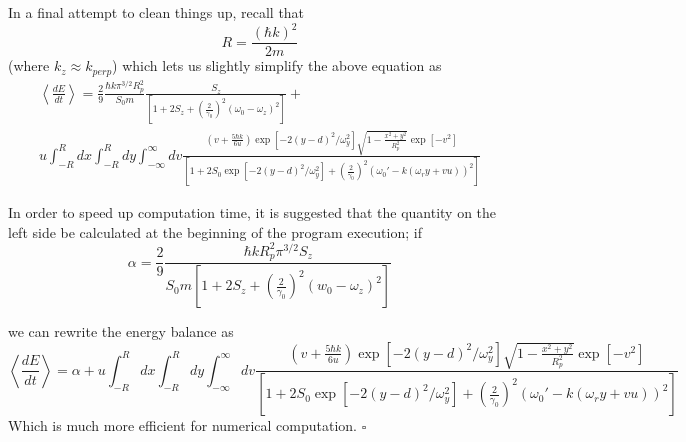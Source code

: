 \documentclass[11pt, oneside,reqno]{amsart}   	%
\newcommand{\eqn}[1]{\begin{equation}#1 \end{equation}}
\begin{document}
 
 In a final attempt to clean things up, recall that \eqn{ R = \frac{(\hbar k)^2}{2m}} (where $k_z \approx k_{perp}$) which lets us slightly simplify the above equation as 
\begin{multline}
 \left< \frac{dE}{dt} \right> =
\frac{2}{9}
\frac{\hbar k \pi^{3/2}R_p^2 }{S_0 m } \frac{S_z }{\left[ 1 + 2S_z+ \left(\frac{2}{\gamma_0}\right)^2(\omega_0 -\omega_z)^2 \right]}+ \\
  u \int_{-R}^{R} dx \int_{-R}^R  dy \int_{-\infty}^{\infty} dv 
 \frac{
 ( v+\frac{5 \hbar k}{6u})
 \exp [ -2 (y-d)^2/\omega_y^2] \sqrt{1-\frac{x^2+y^2}{R_p^2}} \exp [-v^2]
 }
 { \left[ 1+2S_0 \exp [ -2 (y-d)^2/\omega_y^2] +\left( \frac{2}{\gamma_0} \right)^2  (\omega_0' - k(\omega_r y +v u))^2 \right]}
\end{multline}

In order to speed up computation time, it is suggested that the quantity on the left side be calculated at the beginning of the program execution;
if 
\eqn{ \alpha = \frac{2}{9} \frac{ \hbar k  R_p^2 \pi^{3/2} S_z}{ S_0  m \left[ 1+ 2 S_z + \left( \frac{2}{\gamma_0} \right)^2 (w_0 -\omega_z )^2 \right]}}

we can rewrite the energy balance as 
\eqn{  \left< \frac{dE}{dt} \right> = \alpha +  u \int_{-R}^{R} dx \int_{-R}^R  dy \int_{-\infty}^{\infty} dv 
 \frac{
  ( v+\frac{5 \hbar k}{6 u })
 \exp [ -2 (y-d)^2/\omega_y^2] \sqrt{1-\frac{x^2+y^2}{R_p^2}} \exp [-v^2]
 }
 { \left[ 1+2S_0 \exp [ -2 (y-d)^2/\omega_y^2] +\left( \frac{2}{\gamma_0} \right)^2  (\omega_0' - k(\omega_r y +v u))^2 \right]}}
 Which is much more efficient for numerical computation. \flushright $\square$

%
%
%
\end{document}
